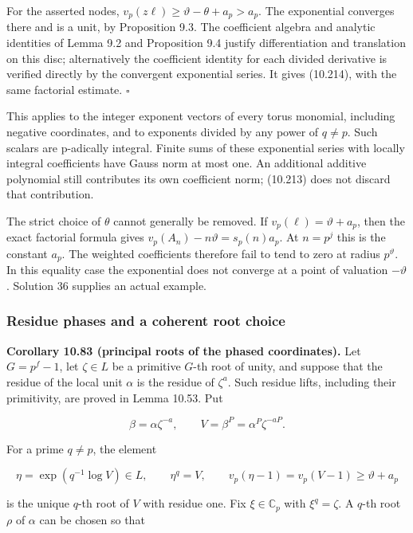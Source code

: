 \documentclass[
  11pt,
  a4paper,
]{article}
\begin{document}
For the asserted nodes, \(v_p(z\ell)\ge\vartheta-\theta+a_p>a_p\). The
exponential converges there and is a unit, by Proposition 9.3. The
coefficient algebra and analytic identities of Lemma 9.2 and Proposition
9.4 justify differentiation and translation on this disc; alternatively
the coefficient identity for each divided derivative is verified
directly by the convergent exponential series. It gives (10.214), with
the same factorial estimate. \(\square\)

This applies to the integer exponent vectors of every torus monomial,
including negative coordinates, and to exponents divided by any power of
\(q\ne p\). Such scalars are p-adically integral. Finite sums of these
exponential series with locally integral coefficients have Gauss norm at
most one. An additional additive polynomial still contributes its own
coefficient norm; (10.213) does not discard that contribution.

The strict choice of \(\theta\) cannot generally be removed. If
\(v_p(\ell)=\vartheta+a_p\), then the exact factorial formula gives
\(v_p(A_n)-n\vartheta=s_p(n)a_p\). At \(n=p^j\) this is the constant
\(a_p\). The weighted coefficients therefore fail to tend to zero at
radius \(p^\vartheta\). In this equality case the exponential does not
converge at a point of valuation \(-\vartheta\). Solution 36 supplies an
actual example.

\subsubsection{Residue phases and a coherent root
choice}\label{residue-phases-and-a-coherent-root-choice}

\textbf{Corollary 10.83 (principal roots of the phased coordinates).}
Let \(G=p^f-1\), let \(\zeta\in L\) be a primitive \(G\)-th root of
unity, and suppose that the residue of the local unit \(\alpha\) is the
residue of \(\zeta^a\). Such residue lifts, including their primitivity,
are proved in Lemma 10.53. Put

\[
\beta=\alpha\zeta^{-a},\qquad
V=\beta^P=\alpha^P\zeta^{-aP}.
\tag{10.215}
\]

For a prime \(q\ne p\), the element

\[
\eta=\exp(q^{-1}\log V)\in L,\qquad
\eta^q=V,\qquad
v_p(\eta-1)=v_p(V-1)\ge\vartheta+a_p
\tag{10.216}
\]

is the unique \(q\)-th root of \(V\) with residue one. Fix
\(\xi\in\mathbb C_p\) with \(\xi^q=\zeta\). A \(q\)-th root \(\rho\) of
\(\alpha\) can be chosen so that
\end{document}
